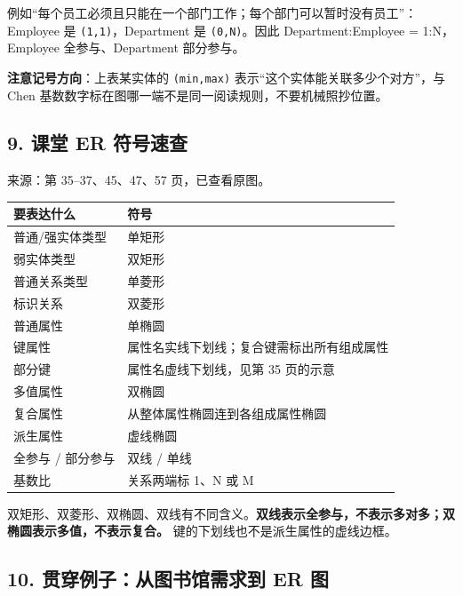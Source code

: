 例如``每个员工必须且只能在一个部门工作；每个部门可以暂时没有员工''：Employee 是 \texttt{(\allowbreak{}1,\allowbreak{}1)\allowbreak{}}，Department 是 \texttt{(\allowbreak{}0,\allowbreak{}N)\allowbreak{}}。因此 Department:Employee = 1:N，Employee 全参与、Department 部分参与。

\textbf{注意记号方向}：上表某实体的 \texttt{(\allowbreak{}min,\allowbreak{}max)\allowbreak{}} 表示``这个实体能关联多少个对方''，与 Chen 基数数字标在图哪一端不是同一阅读规则，不要机械照抄位置。

\subsection{9. 课堂 ER 符号速查}\label{02_er_modelling_zh-ux8bfeux5802-er-ux7b26ux53f7ux901fux67e5}

来源：第 35--37、45、47、57 页，已查看原图。

\begin{longtable}[]{@{}ll@{}}
\toprule\noalign{}
要表达什么 & 符号 \\
\midrule\noalign{}
\endhead
\bottomrule\noalign{}
\endlastfoot
普通/强实体类型 & 单矩形 \\
弱实体类型 & 双矩形 \\
普通关系类型 & 单菱形 \\
标识关系 & 双菱形 \\
普通属性 & 单椭圆 \\
键属性 & 属性名实线下划线；复合键需标出所有组成属性 \\
部分键 & 属性名虚线下划线，见第 35 页的示意 \\
多值属性 & 双椭圆 \\
复合属性 & 从整体属性椭圆连到各组成属性椭圆 \\
派生属性 & 虚线椭圆 \\
全参与 / 部分参与 & 双线 / 单线 \\
基数比 & 关系两端标 1、N 或 M \\
\end{longtable}

双矩形、双菱形、双椭圆、双线有不同含义。\textbf{双线表示全参与，不表示多对多；双椭圆表示多值，不表示复合。} 键的下划线也不是派生属性的虚线边框。

\subsection{10. 贯穿例子：从图书馆需求到 ER 图}\label{02_er_modelling_zh-ux8d2fux7a7fux4f8bux5b50ux4eceux56feux4e66ux9986ux9700ux6c42ux5230-er-ux56fe}

